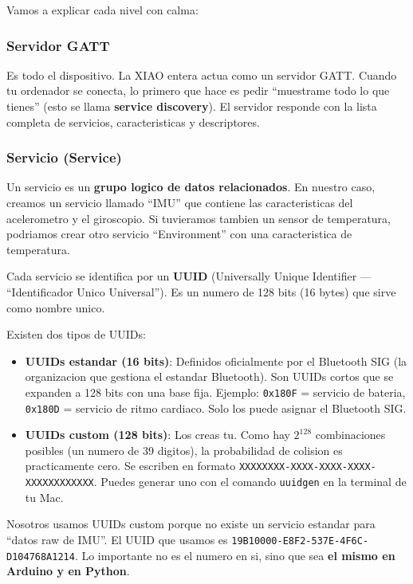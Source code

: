 \documentclass[11pt,a4paper]{article}
\begin{document}
Vamos a explicar cada nivel con calma:

\subsubsection{Servidor GATT}

Es todo el dispositivo. La XIAO entera actua como un servidor GATT.
Cuando tu ordenador se conecta, lo primero que hace es pedir
``muestrame todo lo que tienes'' (esto se llama \textbf{service
discovery}). El servidor responde con la lista completa de
servicios, caracteristicas y descriptores.

\subsubsection{Servicio (Service)}

Un servicio es un \textbf{grupo logico de datos relacionados}.
En nuestro caso, creamos un servicio llamado ``IMU'' que contiene
las caracteristicas del acelerometro y el giroscopio. Si tuvieramos
tambien un sensor de temperatura, podriamos crear otro servicio
``Environment'' con una caracteristica de temperatura.

Cada servicio se identifica por un \textbf{UUID} (Universally Unique
Identifier --- ``Identificador Unico Universal''). Es un numero de
128 bits (16 bytes) que sirve como nombre unico.

Existen dos tipos de UUIDs:

\begin{itemize}
    \item \textbf{UUIDs estandar (16 bits)}: Definidos oficialmente
          por el Bluetooth SIG (la organizacion que gestiona el
          estandar Bluetooth). Son UUIDs cortos que se expanden a
          128 bits con una base fija. Ejemplo:
          \texttt{0x180F} = servicio de bateria,
          \texttt{0x180D} = servicio de ritmo cardiaco. Solo los
          puede asignar el Bluetooth SIG.

    \item \textbf{UUIDs custom (128 bits)}: Los creas tu. Como hay
          $2^{128}$ combinaciones posibles (un numero de 39 digitos),
          la probabilidad de colision es practicamente cero. Se
          escriben en formato
          \texttt{XXXXXXXX-XXXX-XXXX-XXXX-XXXXXXXXXXXX}.
          Puedes generar uno con el comando \texttt{uuidgen} en la
          terminal de tu Mac.
\end{itemize}

Nosotros usamos UUIDs custom porque no existe un servicio estandar
para ``datos raw de IMU''. El UUID que usamos es
\texttt{19B10000-E8F2-537E-4F6C-D104768A1214}. Lo importante no es
el numero en si, sino que sea \textbf{el mismo en Arduino y en
Python}.
\end{document}
